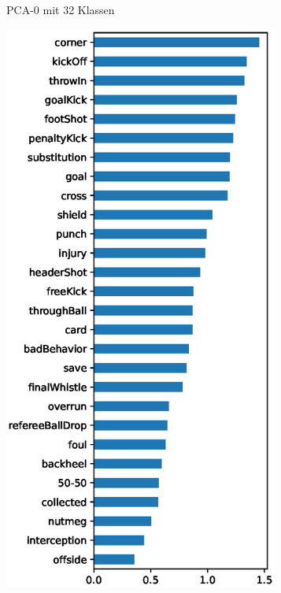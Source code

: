 \begin{figure}
\begin{subfigure}{.24\textwidth}
        \caption{PCA-0 \newline mit 32 Klassen}
        \label{fig:pca_by_class_phase_2}
    \end{subfigure}
    \begin{subfigure}{.24\textwidth}
        \centering
        \includegraphics[width=0.99\textwidth, keepaspectratio, interpolate]{img/07_pca_by_class_socc_har_28.eps}

\end{subfigure}
\end{figure}
